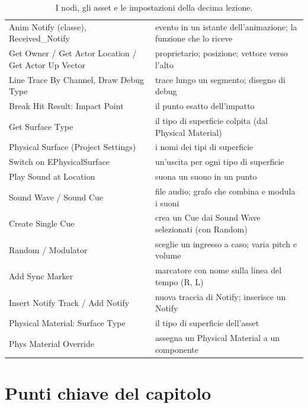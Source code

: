 \begin{table}[htbp]
\begin{tabular}{@{}p{4.8cm}p{9.2cm}@{}}
Anim Notify (classe), Received\_Notify & evento in un istante dell'animazione; la funzione
che lo riceve \\
Get Owner / Get Actor Location / Get Actor Up Vector & proprietario; posizione; vettore
verso l'alto \\
Line Trace By Channel, Draw Debug Type & trace lungo un segmento; disegno di debug \\
Break Hit Result: Impact Point & il punto esatto dell'impatto \\
Get Surface Type & il tipo di superficie colpita (dal Physical Material) \\
Physical Surface (Project Settings) & i nomi dei tipi di superficie \\
Switch on EPhysicalSurface & un'uscita per ogni tipo di superficie \\
Play Sound at Location & suona un suono in un punto \\
Sound Wave / Sound Cue & file audio; grafo che combina e modula i suoni \\
Create Single Cue & crea un Cue dai Sound Wave selezionati (con Random) \\
Random / Modulator & sceglie un ingresso a caso; varia pitch e volume \\
Add Sync Marker & marcatore con nome sulla linea del tempo (R, L) \\
Insert Notify Track / Add Notify & nuova traccia di Notify; inserisce un Notify \\
Physical Material: Surface Type & il tipo di superficie dell'asset \\
Phys Material Override & assegna un Physical Material a un componente \\
\bottomrule
\end{tabular}
\caption{I nodi, gli asset e le impostazioni della decima lezione.}
\label{ue10:tab:nodi}
\end{table}

\section*{Punti chiave del capitolo}


